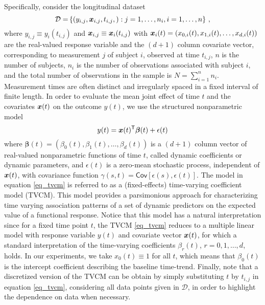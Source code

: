\documentclass[letterpaper,10pt,openany]{article}
\newcommand{\cov}[1]{\textsf{C}\textsf{ov}\left[#1\right]}
\def\be{\beta}\def\bev{\boldsymbol{\beta}}
\def\eps{\epsilon}\def\epsv{\boldsymbol{\epsilon}}
\def\epsv{\boldsymbol{\eps}}
\def\trans{\text{\textsf{T}}}
\begin{document}
Specifically, consider the longitudinal dataset 
$$
{\color{black} \mathcal{D} =} \left\{(y_{i,j}, \boldsymbol{x}_{i,j}, t_{i,j}, ) : j=1,\ldots,n_i, i=1,\ldots,n\right\}\,,
$$ 
where $y_{i,j} \equiv y_i(t_{i,j})$ and $\boldsymbol{x}_{i,j} \equiv \boldsymbol{x}_i(t_{i,j})$ with $\boldsymbol{x}_i(t) = \left(x_{0,i}(t),x_{1,i}(t),\ldots,x_{d,i}(t)\right)$ are the real-valued response variable and the $(d+1)$ column covariate vector,  corresponding to measurement $j$ of subject $i$, observed at time $t_{i,j}$, $n$ is the number of subjects, $n_i$ is the number of observations associated with subject $i$, and the total number of observations in the sample is $N = \sum_{i=1}^n n_i$. Measurement times are often distinct and irregularly spaced in a fixed interval of finite length. In order to evaluate the mean joint effect of time $t$ and the covariates $\boldsymbol{x}(t)$ on the outcome $y(t)$, we use the structured nonparametric model
\begin{equation}\label{eq_tvcm}
y(t) = \xv(t)^\trans\bev(t) + \epsilon(t) \\
\end{equation}
where $\bev(t) = (\beta_{0}(t),\beta_{1}(t),\ldots,\beta_{d}(t))$ is a $(d+1)$ column vector of real-valued nonparametric functions of time $t$, called dynamic coefficients or dynamic parameters, and $\epsilon(t)$ is a zero-mean stochastic process, independent of $\boldsymbol{x}(t)$, with covariance function $\gamma(s,t) = \cov{\eps(s), \eps(t)}$. The model in equation \eqref{eq_tvcm} is referred to as a {\color{black} (fixed-effects)} time-varying coefficient model (\textsf{TVCM}). This model provides a parsimonious approach for characterizing time varying association patterns of a set of dynamic predictors on the expected value of a functional response. Notice that this model has a natural interpretation since for a fixed time point $t$, the \textsf{TVCM} \eqref{eq_tvcm} reduces to a multiple linear model with response variable $y(t)$ and covariate vector $\boldsymbol{x}(t)$, for which a standard interpretation of the time-varying coefficients $\be_r(t)$, $r = 0,1,\ldots,d$, holds. In our experiments, we take $x_0(t) \equiv 1$ for all $t$, which means that $\beta_0(t)$ is the intercept coefficient describing the baseline time-trend. {\color{black} Finally, note that a discretized version of the \textsf{TVCM} can be obtain by simply substituting $t$ by $t_{i,j}$ in equation \eqref{eq_tvcm}, considering all data points given in $\mathcal{D}$, in order to highlight the dependence on data when necessary.}
\end{document}
